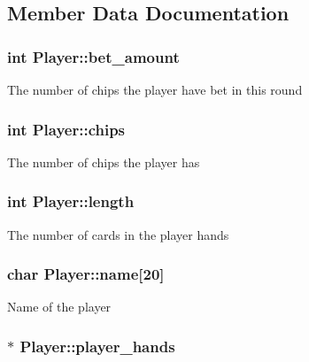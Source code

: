 \subsection{Member Data Documentation}
\hypertarget{structPlayer_a37afeb42d31865a99f75c357f46dad88}{
\subsubsection[{bet\+\_\+amount}]{\setlength{\rightskip}{0pt plus 5cm}int Player\+::bet\+\_\+amount}}\label{structPlayer_a37afeb42d31865a99f75c357f46dad88}
The number of chips the player have bet in this round \hypertarget{structPlayer_a29614b447e37b1c5da87d0f2f75441d5}{
\subsubsection[{chips}]{\setlength{\rightskip}{0pt plus 5cm}int Player\+::chips}}\label{structPlayer_a29614b447e37b1c5da87d0f2f75441d5}
The number of chips the player has \hypertarget{structPlayer_a8f9727475d39a22eec59dd3905357e9e}{
\subsubsection[{length}]{\setlength{\rightskip}{0pt plus 5cm}int Player\+::length}}\label{structPlayer_a8f9727475d39a22eec59dd3905357e9e}
The number of cards in the player hands \hypertarget{structPlayer_ab71c17a9d17662887a1ecd0b32fe8812}{
\subsubsection[{name}]{\setlength{\rightskip}{0pt plus 5cm}char Player\+::name\mbox{[}20\mbox{]}}}\label{structPlayer_ab71c17a9d17662887a1ecd0b32fe8812}
Name of the player \hypertarget{structPlayer_a01bb1b5125e4aad0e98d16c7d68b059e}{
\subsubsection[{player\+\_\+hands}]{$\ast$ Player\+::player\+\_\+hands}}\label{structPlayer_a01bb1b5125e4aad0e98d16c7d68b059e}
